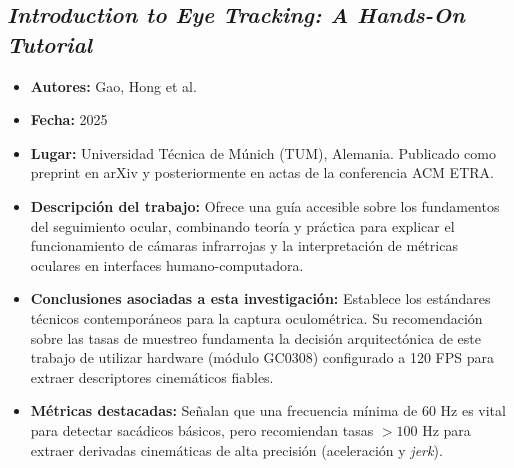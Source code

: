 \subsection{\textit{Introduction to Eye Tracking: A Hands-On Tutorial}}
\begin{itemize}
	\item \textbf{Autores:} Gao, Hong et al. \cite{gao2025eye_tracking_tutorial}
	\item \textbf{Fecha:} 2025
	\item \textbf{Lugar:} Universidad Técnica de Múnich (TUM), Alemania. Publicado como preprint en arXiv y posteriormente en actas de la conferencia ACM ETRA.
	\item \textbf{Descripción del trabajo:} Ofrece una guía accesible sobre los fundamentos del seguimiento ocular, combinando teoría y práctica para explicar el funcionamiento de cámaras infrarrojas y la interpretación de métricas oculares en interfaces humano-computadora.
	\item \textbf{Conclusiones asociadas a esta investigación:} Establece los estándares técnicos contemporáneos para la captura oculométrica. Su recomendación sobre las tasas de muestreo fundamenta la decisión arquitectónica de este trabajo de utilizar hardware (módulo GC0308) configurado a 120 FPS para extraer descriptores cinemáticos fiables.
	\item \textbf{Métricas destacadas:} Señalan que una frecuencia mínima de 60 Hz es vital para detectar sacádicos básicos, pero recomiendan tasas $>100$ Hz para extraer derivadas cinemáticas de alta precisión (aceleración y \textit{jerk}).
\end{itemize}

